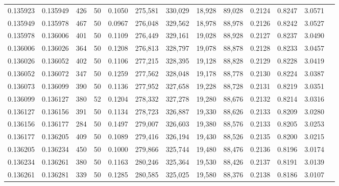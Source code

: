 \begin{tabular}{rrrrrrrrrrrrr}
0.135923 & 0.135949 &   426 &  50 &                                     0.1050 & 275,581 & 330,029 &  18,928 &  89,028 & 0.2124 & 0.8247 & 3.0571 \\
0.135949 & 0.135978 &   467 &  50 &                                     0.0967 & 276,048 & 329,562 &  18,978 &  88,978 & 0.2126 & 0.8242 & 3.0527 \\
0.135978 & 0.136006 &   401 &  50 &                                     0.1109 & 276,449 & 329,161 &  19,028 &  88,928 & 0.2127 & 0.8237 & 3.0490 \\
0.136006 & 0.136026 &   364 &  50 &                                     0.1208 & 276,813 & 328,797 &  19,078 &  88,878 & 0.2128 & 0.8233 & 3.0457 \\
0.136026 & 0.136052 &   402 &  50 &                                     0.1106 & 277,215 & 328,395 &  19,128 &  88,828 & 0.2129 & 0.8228 & 3.0419 \\
0.136052 & 0.136072 &   347 &  50 &                                     0.1259 & 277,562 & 328,048 &  19,178 &  88,778 & 0.2130 & 0.8224 & 3.0387 \\
0.136073 & 0.136099 &   390 &  50 &                                     0.1136 & 277,952 & 327,658 &  19,228 &  88,728 & 0.2131 & 0.8219 & 3.0351 \\
0.136099 & 0.136127 &   380 &  52 &                                     0.1204 & 278,332 & 327,278 &  19,280 &  88,676 & 0.2132 & 0.8214 & 3.0316 \\
0.136127 & 0.136156 &   391 &  50 &                                     0.1134 & 278,723 & 326,887 &  19,330 &  88,626 & 0.2133 & 0.8209 & 3.0280 \\
0.136156 & 0.136177 &   284 &  50 &                                     0.1497 & 279,007 & 326,603 &  19,380 &  88,576 & 0.2133 & 0.8205 & 3.0253 \\
0.136177 & 0.136205 &   409 &  50 &                                     0.1089 & 279,416 & 326,194 &  19,430 &  88,526 & 0.2135 & 0.8200 & 3.0215 \\
0.136205 & 0.136234 &   450 &  50 &                                     0.1000 & 279,866 & 325,744 &  19,480 &  88,476 & 0.2136 & 0.8196 & 3.0174 \\
0.136234 & 0.136261 &   380 &  50 &                                     0.1163 & 280,246 & 325,364 &  19,530 &  88,426 & 0.2137 & 0.8191 & 3.0139 \\
0.136261 & 0.136281 &   339 &  50 &                                     0.1285 & 280,585 & 325,025 &  19,580 &  88,376 & 0.2138 & 0.8186 & 3.0107 \\

\end{tabular}
